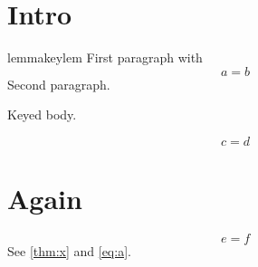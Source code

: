\documentclass{article}
\begin{document}
\section{Intro}
\begin{restatable}{lemma}{keylem}\label{lem:k}
First paragraph with
\begin{equation}\label{eq:a} a=b \end{equation}
Second paragraph.
\end{restatable}
\begin{theorem}[restate=mythm, name=Named]\label{thm:x}
Keyed body.
\end{theorem}
\begin{equation} c=d \end{equation}
\section{Again}
\keylem*
\mythm*
\begin{equation} e=f \end{equation}
See \ref{thm:x} and \eqref{eq:a}.
\end{document}
